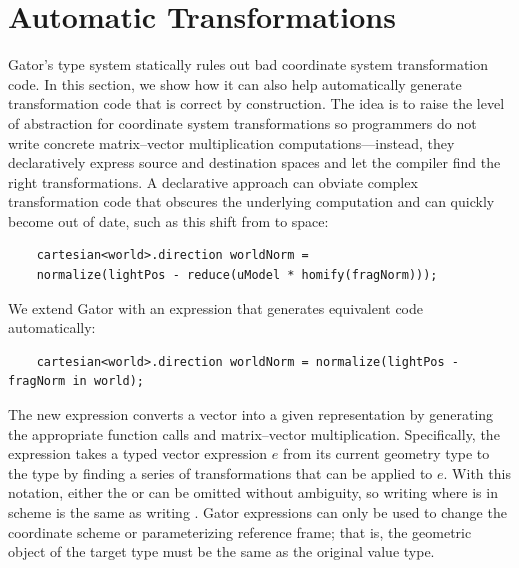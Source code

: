 \documentclass[../main.tex]{subfiles}
\begin{document}
\section{Automatic Transformations}
\label{sec:in}

Gator's type system statically rules out bad coordinate system transformation code.
In this section, we show how it can also help automatically generate transformation code that is correct by construction.
The idea is to raise the level of abstraction for coordinate system transformations so programmers do not write concrete matrix--vector multiplication computations---instead, they declaratively express source and destination spaces and let the compiler find the right transformations.
A declarative approach can obviate complex transformation code that
obscures the underlying computation and can quickly become out of date, such as this shift from  to  space:
%
\begin{lstlisting}
	cartesian<world>.direction worldNorm = 
	normalize(lightPos - reduce(uModel * homify(fragNorm)));
\end{lstlisting}
%
We extend Gator with an  expression that generates equivalent code automatically:
%
\begin{lstlisting}
	cartesian<world>.direction worldNorm = normalize(lightPos - fragNorm in world);
\end{lstlisting}
%
The new expression converts a vector into a given representation by generating the appropriate function calls and matrix--vector multiplication.
Specifically, the expression  takes a typed vector expression $e$ from its current geometry type  to the type  by finding a series of transformations that can be applied to $e$.
With this notation, either the  or  can be omitted without ambiguity, so writing  where  is in scheme  is the same as writing .
Gator  expressions can only be used to change the coordinate scheme or parameterizing reference frame; that is, the geometric object of the target type must be the same as the original value type.
\end{document}

